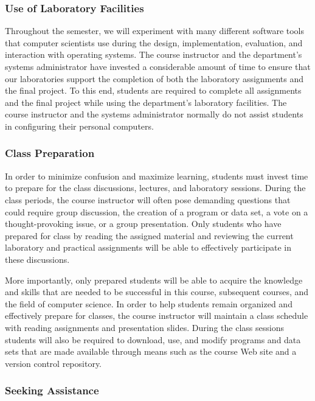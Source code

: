 \subsubsection*{Use of Laboratory Facilities}

Throughout the semester, we will experiment with many different software tools that computer scientists use during the
design, implementation, evaluation, and interaction with operating systems.  The course instructor and the
department's systems administrator have invested a considerable amount of time to ensure that our laboratories support
the completion of both the laboratory assignments and the final project.  To this end, students are required to complete
all assignments and the final project while using the department's laboratory facilities. The course instructor and the
systems administrator normally do not assist students in configuring their personal computers.

\subsubsection*{Class Preparation}

In order to minimize confusion and maximize learning, students must invest time to prepare for the class discussions,
lectures, and laboratory sessions.  During the class periods, the course instructor will often pose demanding questions
that could require group discussion, the creation of a program or data set, a vote on a thought-provoking issue, or a
group presentation.  Only students who have prepared for class by reading the assigned material and reviewing the
current laboratory and practical assignments will be able to effectively participate in these discussions.

More importantly, only prepared students will be able to acquire the knowledge and skills that are needed to be
successful in this course, subsequent courses, and the field of computer science.  In order to help students remain
organized and effectively prepare for classes, the course instructor will maintain a class schedule with reading
assignments and presentation slides.   During the class sessions students will also be required to download, use, and
modify programs and data sets that are made available through means such as the course Web site and a version control
repository.

\subsubsection*{Seeking Assistance}

